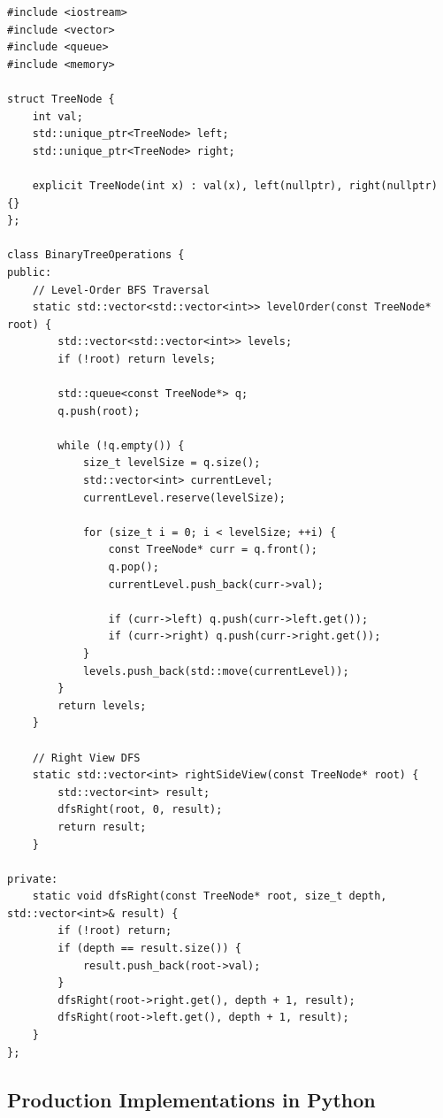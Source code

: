 \documentclass[10pt,journal,compsoc,onecolumn]{IEEEtran}
\begin{document}
\begin{verbatim}
#include <iostream>
#include <vector>
#include <queue>
#include <memory>

struct TreeNode {
    int val;
    std::unique_ptr<TreeNode> left;
    std::unique_ptr<TreeNode> right;

    explicit TreeNode(int x) : val(x), left(nullptr), right(nullptr) {}
};

class BinaryTreeOperations {
public:
    // Level-Order BFS Traversal
    static std::vector<std::vector<int>> levelOrder(const TreeNode* root) {
        std::vector<std::vector<int>> levels;
        if (!root) return levels;

        std::queue<const TreeNode*> q;
        q.push(root);

        while (!q.empty()) {
            size_t levelSize = q.size();
            std::vector<int> currentLevel;
            currentLevel.reserve(levelSize);

            for (size_t i = 0; i < levelSize; ++i) {
                const TreeNode* curr = q.front();
                q.pop();
                currentLevel.push_back(curr->val);

                if (curr->left) q.push(curr->left.get());
                if (curr->right) q.push(curr->right.get());
            }
            levels.push_back(std::move(currentLevel));
        }
        return levels;
    }

    // Right View DFS
    static std::vector<int> rightSideView(const TreeNode* root) {
        std::vector<int> result;
        dfsRight(root, 0, result);
        return result;
    }

private:
    static void dfsRight(const TreeNode* root, size_t depth, std::vector<int>& result) {
        if (!root) return;
        if (depth == result.size()) {
            result.push_back(root->val);
        }
        dfsRight(root->right.get(), depth + 1, result);
        dfsRight(root->left.get(), depth + 1, result);
    }
};
\end{verbatim}

\subsection{Production Implementations in Python}
\end{document}
